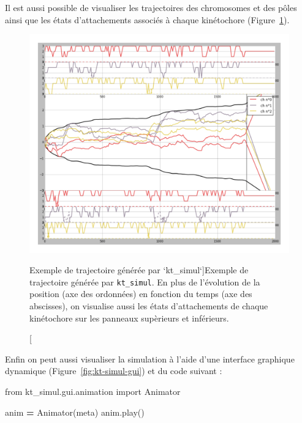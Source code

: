 \documentclass[12pt,a4paper,twoside,openright]{book}
\newenvironment{Shaded}{\begin{snugshade}}{\end{snugshade}}
\newcommand{\ImportTok}[1]{{#1}}
\newcommand{\OperatorTok}[1]{\textcolor[rgb]{0.81,0.36,0.00}{\textbf{{#1}}}}
\newcommand{\NormalTok}[1]{{#1}}
\begin{document}
Il est aussi possible de visualiser les trajectoires des chromosomes et
des pôles ainsi que les états d'attachements associés à chaque
kinétochore (Figure~\ref{fig:kt-simul-traj}).

\begin{figure}[htbp]
\centering
\includegraphics{figures/annexes/trajectories.png}
\caption[Exemple de trajectoire générée par `kt\_simul`]{\label{fig:kt-simul-traj}Exemple
de trajectoire générée par \texttt{kt\_simul}. En plus de l'évolution de
la position (axe des ordonnées) en fonction du temps (axe des
abscisses), on visualise aussi les états d'attachements de chaque
kinétochore sur les panneaux supèrieurs et inférieurs.}
\end{figure}

Enfin on peut aussi visualiser la simulation à l'aide d'une interface
graphique dynamique (Figure~\ref{fig:kt-simul-gui}) et du code suivant :

\begin{Shaded}
\begin{Highlighting}[]
\ImportTok{from} \NormalTok{kt_simul.gui.animation }\ImportTok{import} \NormalTok{Animator}

\NormalTok{anim }\OperatorTok{=} \NormalTok{Animator(meta)}
\NormalTok{anim.play()}
\end{Highlighting}
\end{Shaded}
\end{document}
